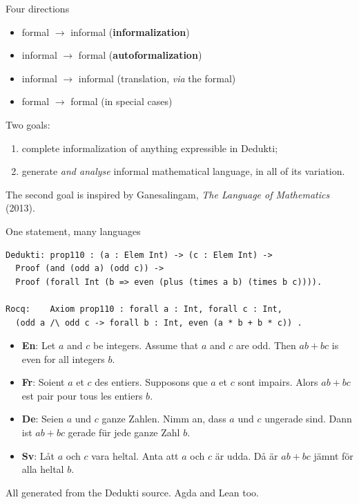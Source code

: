 \documentclass[10pt,aspectratio=169]{beamer}
\begin{document}
\begin{frame}{Four directions}
  \begin{itemize}
    \item formal $\rightarrow$ informal \quad (\textbf{informalization})
    \item informal $\rightarrow$ formal \quad (\textbf{autoformalization})
    \item informal $\rightarrow$ informal \quad (translation, \emph{via} the formal)
    \item formal $\rightarrow$ formal \quad (in special cases)
  \end{itemize}

  \vspace{1em}
  Two goals:
  \begin{enumerate}
    \item complete informalization of anything expressible in Dedukti;
    \item generate \emph{and analyse} informal mathematical language,
          in all of its variation.
  \end{enumerate}

  \vspace{0.5em}
  \small The second goal is inspired by Ganesalingam, \emph{The Language of
  Mathematics} (2013).
\end{frame}

\begin{frame}[fragile]{One statement, many languages}
\begin{lstlisting}
Dedukti: prop110 : (a : Elem Int) -> (c : Elem Int) ->
  Proof (and (odd a) (odd c)) ->
  Proof (forall Int (b => even (plus (times a b) (times b c)))).

Rocq:    Axiom prop110 : forall a : Int, forall c : Int,
  (odd a /\ odd c -> forall b : Int, even (a * b + b * c)) .
\end{lstlisting}

\vspace{-0.2em}
\begin{itemize}\footnotesize
  \item \textbf{En}: Let $a$ and $c$ be integers. Assume that $a$ and $c$ are odd.
        Then $ab + bc$ is even for all integers $b$.
  \item \textbf{Fr}: Soient $a$ et $c$ des entiers. Supposons que $a$ et $c$ sont impairs.
        Alors $ab + bc$ est pair pour tous les entiers $b$.
  \item \textbf{De}: Seien $a$ und $c$ ganze Zahlen. Nimm an, dass $a$ und $c$ ungerade sind.
        Dann ist $ab + bc$ gerade für jede ganze Zahl $b$.
  \item \textbf{Sv}: Låt $a$ och $c$ vara heltal. Anta att $a$ och $c$ är udda.
        Då är $ab + bc$ jämnt för alla heltal $b$.
  \end{itemize}

  \vspace{0.2em}
  \footnotesize All generated from the Dedukti source. Agda and Lean too.
\end{frame}
\end{document}
